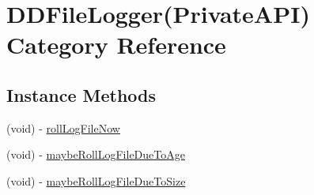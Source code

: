 \hypertarget{category_d_d_file_logger_07_private_a_p_i_08}{\section{D\-D\-File\-Logger(Private\-A\-P\-I) Category Reference}
\label{category_d_d_file_logger_07_private_a_p_i_08}
}
\subsection*{Instance Methods}
\begin{DoxyCompactItemize}
\item 
(void) -\/ \hyperlink{category_d_d_file_logger_07_private_a_p_i_08_af5024cc2d885ad3d514759ba07c496fc}{roll\-Log\-File\-Now}
\item 
(void) -\/ \hyperlink{category_d_d_file_logger_07_private_a_p_i_08_a8460349022c7453707a0ba0177819b54}{maybe\-Roll\-Log\-File\-Due\-To\-Age}
\item 
(void) -\/ \hyperlink{category_d_d_file_logger_07_private_a_p_i_08_a93ec0b32604d7cec398b74ba86db52c6}{maybe\-Roll\-Log\-File\-Due\-To\-Size}
\end{DoxyCompactItemize}



